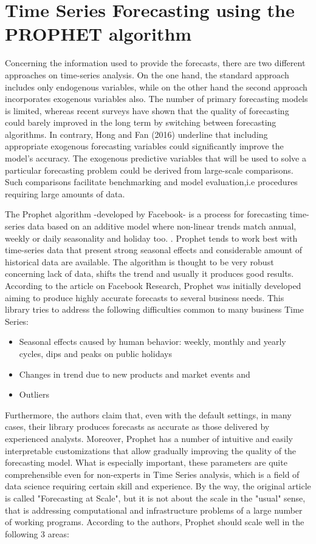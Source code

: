 \chapter{Time Series Forecasting using the PROPHET algorithm}
\par 
Concerning the information used to provide the forecasts, there are two different approaches on time-series analysis. On the one hand, the standard approach includes only endogenous variables, while on the other hand the second approach incorporates exogenous variables also. The number of primary forecasting models is limited, whereas recent surveys have shown that the quality of forecasting could barely improved in the long term by switching between forecasting algorithms. In contrary, Hong and Fan (2016) underline that including appropriate exogenous forecasting variables could significantly improve the model's accuracy. The exogenous predictive variables that will be used to solve a particular forecasting problem could be derived from large-scale comparisons. Such comparisons facilitate benchmarking and model evaluation,i.e procedures requiring large amounts of data.
\par The Prophet algorithm -developed by Facebook- is a process for forecasting time-series data based on an additive model where non-linear trends match annual, weekly or daily seasonality and holiday too. \cite{taylor2018forecasting}. Prophet tends to work best with time-series data that present strong seasonal effects and considerable amount of historical data are available. The algorithm is thought to be very robust concerning lack of data, shifts the trend and usually it produces good results. According to the article on Facebook Research, Prophet was initially developed aiming to produce highly accurate forecasts to several business needs. This library tries to address the following difficulties common to many business Time Series: 
\begin{itemize}
    \item Seasonal effects caused by human behavior: weekly, monthly and yearly cycles, dips and peaks on public holidays
    \item Changes in trend due to new products and market events and 
    \item Outliers
\end{itemize}
Furthermore, the authors claim that, even with the default settings, in many cases, their library produces forecasts as accurate as those delivered by experienced analysts. Moreover, Prophet has a number of intuitive and easily interpretable customizations that allow gradually improving the quality of the forecasting model. What is especially important, these parameters are quite comprehensible even for non-experts in Time Series analysis, which is a field of data science requiring certain skill and experience. By the way, the original article is called "Forecasting at Scale", but it is not about the scale in the "usual" sense, that is addressing computational and infrastructure problems of a large number of working programs. According to the authors, Prophet should scale well in the following 3 areas:
